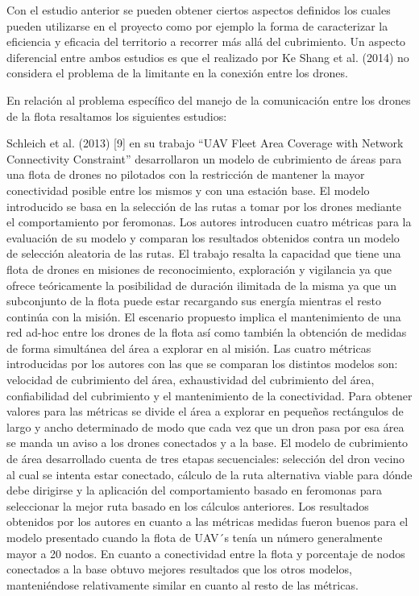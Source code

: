 Con el estudio anterior se pueden obtener ciertos aspectos definidos los cuales pueden utilizarse en el proyecto como por ejemplo la forma de caracterizar la eficiencia y eficacia del territorio a recorrer más allá del cubrimiento. Un aspecto diferencial entre ambos estudios es que el realizado por Ke Shang et al. (2014) no considera el problema de la limitante en la conexión entre los drones.

En relación al problema específico del manejo de la comunicación entre los drones de la flota resaltamos los siguientes estudios:

Schleich et al. (2013) [9] en su trabajo “UAV Fleet Area Coverage with Network Connectivity Constraint” desarrollaron un modelo de cubrimiento de áreas para una flota de drones no pilotados con la restricción de mantener la mayor conectividad posible entre los mismos y con una estación base. El modelo introducido se basa en la selección de las rutas a tomar por los drones mediante el comportamiento por feromonas. Los autores introducen cuatro métricas para la evaluación de su modelo y comparan los resultados obtenidos contra un modelo de selección aleatoria de las rutas. El trabajo resalta la capacidad que tiene una flota de drones en misiones de reconocimiento, exploración y vigilancia ya que ofrece teóricamente la posibilidad de duración ilimitada de la misma ya que un subconjunto de la flota puede estar recargando sus energía mientras el resto continúa con la misión. El escenario propuesto implica el mantenimiento de una red ad-hoc entre los drones de la flota así como también la obtención de medidas de forma simultánea del área a explorar en al misión. Las cuatro métricas introducidas por los autores con las que se comparan los distintos modelos son: velocidad de cubrimiento del área, exhaustividad del cubrimiento del área, confiabilidad del cubrimiento y el mantenimiento de la conectividad. Para obtener valores para las métricas se divide el área a explorar en pequeños rectángulos de largo y ancho determinado de modo que cada vez que un dron pasa por esa área se manda un aviso a los drones conectados y a la base. El modelo de cubrimiento de área desarrollado cuenta de tres etapas secuenciales: selección del dron vecino al cual se intenta estar conectado, cálculo de la ruta alternativa viable para dónde debe dirigirse y la aplicación del comportamiento basado en feromonas para seleccionar la mejor ruta basado en los cálculos anteriores. Los resultados obtenidos por los autores en cuanto a las métricas medidas fueron buenos para el modelo presentado cuando la flota de UAV´s tenía un número generalmente mayor a 20 nodos. En cuanto a conectividad entre la flota y porcentaje de nodos conectados a la base obtuvo mejores resultados que los otros modelos, manteniéndose relativamente similar en cuanto al resto de las métricas.
